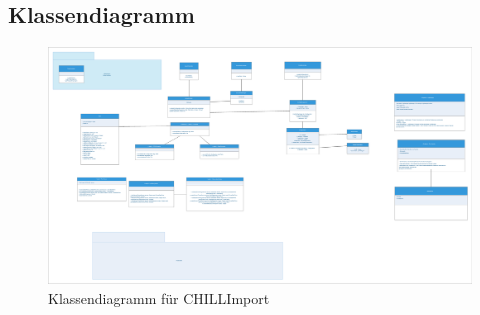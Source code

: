 \subsection{Klassendiagramm}

\begin{figure}[htbp]
\centering
\includegraphics[scale=0.15]{Klassendiagramm/klassendiagramm.eps}
\caption{Klassendiagramm für CHILLImport}
\end{figure}